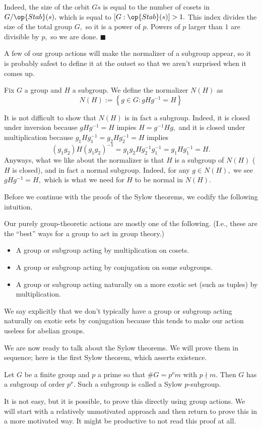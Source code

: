 Indeed, the size of the orbit $Gs$ is equal to the number of cosets in $G/\op{Stab}(s),$ which is equal to $[G:\op{Stab}(s)]>1.$ This index divides the size of the total group $G,$ so it is a power of $p.$ Powers of $p$ larger than $1$ are divisible by $p,$ so we are done. $\blacksquare$

A few of our group actions will make the normalizer of a subgroup appear, so it is probably safest to define it at the outset so that we aren't surprised when it comes up.
\begin{definition}
    Fix $G$ a group and $H$ a subgroup. We define the normalizer $N(H)$ as
    \[N(H):=\left\{g\in G:gHg^{-1}=H\right\}\]
\end{definition}
It is not difficult to show that $N(H)$ is in fact a subgroup. Indeed, it is closed under inversion because $gHg^{-1}=H$ impies $H=g^{-1}Hg,$ and it is closed under multiplication because $g_1Hg_1^{-1}=g_2Hg_2^{-1}=H$ implies
\[(g_1g_2)H(g_1g_2)^{-1}=g_1g_2Hg_2^{-1}g_1^{-1}=g_1Hg_1^{-1}=H.\]
Anyways, what we like about the normalizer is that $H$ is a subgroup of $N(H)$ ($H$ is closed), and in fact a normal subgroup. Indeed, for any $g\in N(H),$ we see $gHg^{-1}=H,$ which is what we need for $H$ to be normal in $N(H).$

Before we continue with the proofs of the Sylow theorems, we codify the following intuition.
\begin{idea}
    Our purely group-theoretic actions are mostly one of the following. (I.e., these are the ``best'' ways for a group to act in group theory.)
    \begin{itemize}
        \item A group or subgroup acting by multiplication on cosets.
        \item A group or subgroup acting by conjugation on some subgroups.
        \item A group or subgroup acting naturally on a more exotic set (such as tuples) by multiplication.
    \end{itemize}
    We say explicitly that we don't typically have a group or subgroup acting naturally on exotic sets by conjugation because this tends to make our action useless for abelian groups.
\end{idea}

We are now ready to talk about the Sylow theorems. We will prove them in sequence; here is the first Sylow theorem, which asserts existence.
\begin{theorem}
    Let $G$ be a finite group and $p$ a prime so that $\#G=p^\nu m$ with $p\nmid m.$ Then $G$ has a subgroup of order $p^\nu.$ Such a subgroup is called a Sylow $p$-subgroup.
\end{theorem}
It is not easy, but it is possible, to prove this directly using group actions. We will start with a relatively unmotivated approach and then return to prove this in a more motivated way. It might be productive to not read this proof at all.

